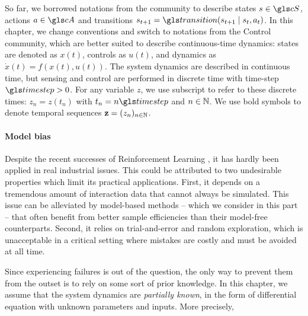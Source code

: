 \begin{remark}
\begin{leftbar}[remarkbar]
So far, we borrowed notations from the  community to describe states $s\in \cS$, actions $a\in\cA$ and transitions $s_{t+1} = \Ps\parentheses{s_{t+1}\mid s_t,a_t}$. In this chapter, we change conventions and switch to notations from the Control community, which are better suited to describe continuous-time dynamics: states are denoted as $x(t)$, controls as $u(t)$, and dynamics as $\dot{x}(t) = f(x(t), u(t))$. 
The system dynamics are described in continuous time, but sensing and control are performed in discrete time with time-step $\timestep>0$. For any variable $z$, we use subscript to refer to these discrete times: $z_n = z(t_n)$ with $t_n = n\timestep$ and $n\in\mathbb{N}$. We use bold symbols to denote temporal sequences $\mathbf{z} = (z_n)_{n\in\mathbb{N}}$.
\end{leftbar}
\end{remark}

\paragraph{Model bias}
Despite the recent successes of Reinforcement Learning \citep[\eg][]{Mnih2015humanlevel,Silver2018}, it has hardly been applied in real industrial issues. This could be attributed to two undesirable properties which limit its practical applications. First, it depends on a tremendous amount of interaction data that cannot always be simulated. This issue can be alleviated by model-based methods -- which we consider in this part -- that often benefit from better sample efficiencies than their model-free counterparts. Second, it relies on trial-and-error and random exploration, which is unacceptable in a critical setting where mistakes are costly and must be avoided at all time.

Since experiencing failures is out of the question, the only way to prevent them from the outset is to rely on some sort of prior knowledge. In this chapter, we assume that the system dynamics are \emph{partially known}, in the form of differential equation with unknown parameters and inputs. More precisely,

